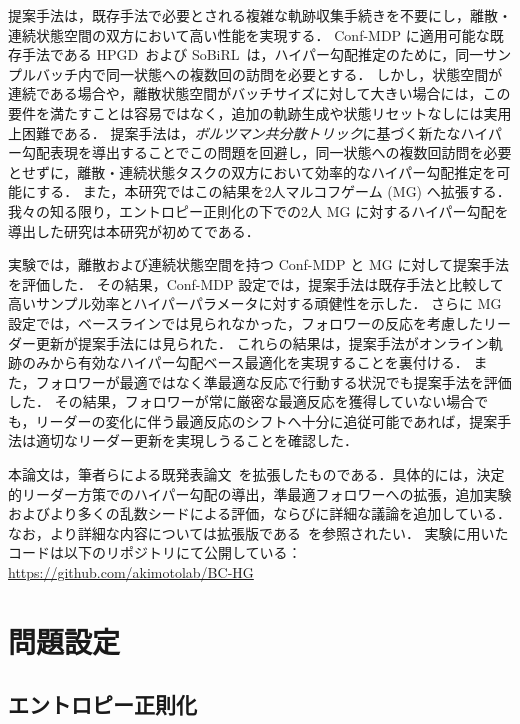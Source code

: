 \documentclass[originalpaper,fleqn]{jsaiart}     %
\begin{document}
提案手法は，既存手法で必要とされる複雑な軌跡収集手続きを不要にし，離散・連続状態空間の双方において高い性能を実現する．
Conf-MDP に適用可能な既存手法である HPGD~\cite{Thoma2024-em}および SoBiRL~\cite{Yang2025-lr}は，ハイパー勾配推定のために，同一サンプルバッチ内で同一状態への複数回の訪問を必要とする．
しかし，状態空間が連続である場合や，離散状態空間がバッチサイズに対して大きい場合には，この要件を満たすことは容易ではなく，追加の軌跡生成や状態リセットなしには実用上困難である．
提案手法は，\emph{ボルツマン共分散トリック}に基づく新たなハイパー勾配表現を導出することでこの問題を回避し，同一状態への複数回訪問を必要とせずに，離散・連続状態タスクの双方において効率的なハイパー勾配推定を可能にする．
また，本研究ではこの結果を2人マルコフゲーム (MG) へ拡張する．
我々の知る限り，エントロピー正則化の下での2人 MG に対するハイパー勾配を導出した研究は本研究が初めてである．

実験では，離散および連続状態空間を持つ Conf-MDP と MG に対して提案手法を評価した．
その結果，Conf-MDP 設定では，提案手法は既存手法と比較して高いサンプル効率とハイパーパラメータに対する頑健性を示した．
さらに MG 設定では，ベースラインでは見られなかった，フォロワーの反応を考慮したリーダー更新が提案手法には見られた．
これらの結果は，提案手法がオンライン軌跡のみから有効なハイパー勾配ベース最適化を実現することを裏付ける．
また，フォロワーが最適ではなく準最適な反応で行動する状況でも提案手法を評価した．
その結果，フォロワーが常に厳密な最適反応を獲得していない場合でも，リーダーの変化に伴う最適反応のシフトへ十分に追従可能であれば，提案手法は適切なリーダー更新を実現しうることを確認した．

本論文は，筆者らによる既発表論文~\cite{kudo2026-icaps}を拡張したものである．具体的には，決定的リーダー方策でのハイパー勾配の導出，準最適フォロワーへの拡張，追加実験およびより多くの乱数シードによる評価，ならびに詳細な議論を追加している．
なお，より詳細な内容については拡張版である~\cite{kudo2026-arxiv}を参照されたい．
実験に用いたコードは以下のリポジトリにて公開している：
\url{https://github.com/akimotolab/BC-HG}

\section{問題設定}

\subsection{エントロピー正則化}
\end{document}
